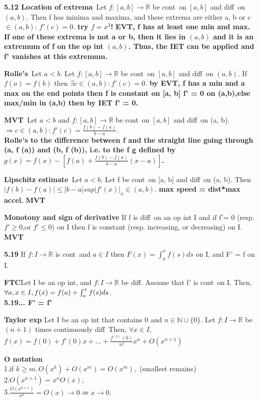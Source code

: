 \documentclass[10pt,landscape,a4paper]{article}
\def\line{

  \noindent{\color{mygray} \rule{\linewidth}{0.005mm}}

}
\def\R{\mathbb{R}}
\def\N{\mathbb{N}}
\def\decreasing{\textcolor{twilightlavender}{decreasing}}
\def\diff{\textcolor{brickred}{diff}}
\def\cont{\textcolor{brickred}{cont}}
\newcommand\thm[1]{\line\textcolor{darklavender}{\bf#1}}
\newcommand\hint[1]{\textcolor{trolleygrey}{\bf#1}}
\newcommand\greenbox[1]{\line\textcolor{ferngreen}{\bf#1}}
\begin{document}
\begin{multicols}{8}
\thm{ 5.12 Location of extrema}\ Let $f : [a, b] \to \R$ be \cont\ on $[a, b]$ and \diff\ on $(a, b)$. Then f has
minima and maxima, and these extrema are either a, b or c $\in (a, b)$:
$f'(c) = 0$.
\hint{try $f = x^3$!}
\hint{EVT, f has at least one min and max. If one of
these extrema is not a or b, then it lies in $(a, b)$ and it is an extremum of f
on the op int $(a, b)$. Thus, the IET can be applied and f' vanishes at this
extremum.}

\thm{Rolle's}\ Let $a < b$. Let $f : [a, b] \to \R$ be \cont\ on $[a, b]$ and \diff\ on $(a, b)$. If $f(a) = f(b)$ then $\exists c \in (a, b): f'(c) = 0$.
\hint{by EVT, f has a min and a max on the end points then f is constant on [a, b] f' = 0 on (a,b),else max/min in (a,b) then by IET f' = 0.}

\thm{MVT}\ Let $a < b$ and $f : [a, b] \to \R$ be \cont\ on $[a, b]$ and \diff\ on (a, b). $\Rightarrow c \in (a, b): f'(c) = \frac{f (b) -f(a)}{b-a}.$
\\\hint{*Rolle’s to the difference between f and the straight line going through (a, f (a)) and (b, f (b)),  i.e. to the f g defined by $g(x) =f (x) - [f (a) + \frac{f (b)-f(a)}{b-a} (x - a)]$.}


\thm{Lipschitz estimate}\
Let $a < b$. Let f be \cont\ on [a, b] and \diff\ on (a, b). Then $|f(b) -
f (a)| \leq |b - a| sup|f'(x)|_x\in (a,b).$
\hint{max speed = dist*max accel.}
\hint{MVT}

\thm{Monotony and sign of derivative}
If f is \diff\ on an op int I and if f'= 0 (resp. $f'\geq 0$,or $f' \leq 0$) on I then f is constant (resp. increasing, or \decreasing) on I.
\hint{MVT}

\thm{5.19}
If $f : I \to \R$ is \cont\ and $a \in I$ then $F(x) = \int_{a}^{x} f(s)ds$ on I, and F' = f on I.

\thm{FTC}Let I be an op int, and $f : I \to \R$ be \diff. Assume that f' is
\cont\ on I. Then, $\forall a, x \in I, \\f(x) = f(a) + \int_{a}^{x} f(s)ds$.
\\\hint{5.19... F' = f'}

\thm{Taylor exp}
Let I be an op int that contains 0 and $n \in \N \cup \{0\}$. Let $f : I \to \R$ be $(n + 1)$ times continuously \diff\ Then, $\forall x \in I$,
\\$f(x) = f(0) + f'(0)x +\hdots+ \frac{f^{(n)}(0)}{n!}x^{n}+O(x^{n+1})$

\greenbox{O notation}\\
1.if $k\geq m, O(x^k)+O(x^m) = O(x^m),$ (smallest remains)\\
2.$O(x^{n+1}) = x^n O(x),$\\
3.$\frac{O(x^{n+1})}{x^n} = O(x) \to 0$ as $x \to 0.$


\end{multicols}
\end{document}
